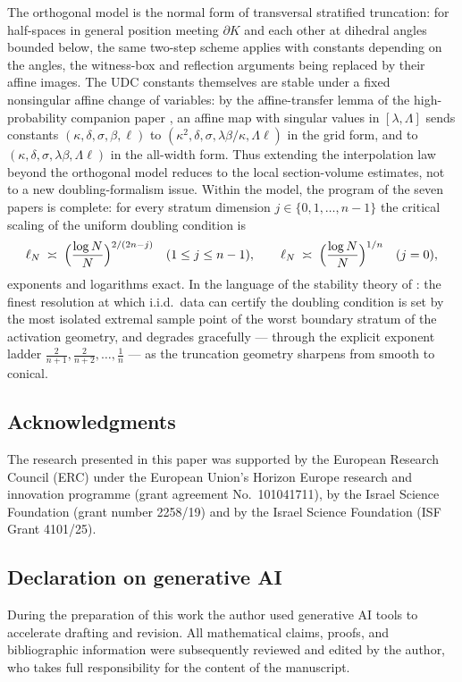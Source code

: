 ﻿\documentclass[11pt]{article}
\begin{document}
The orthogonal model is the normal form of transversal stratified truncation:
for half-spaces in general position meeting $\partial K$ and each other at
dihedral angles bounded below, the same two-step scheme applies with
constants depending on the angles, the witness-box and reflection arguments
being replaced by their affine images.  The UDC constants themselves are stable
under a fixed nonsingular affine change of variables: by the affine-transfer
lemma of the high-probability companion paper \cite{companion2}, an affine map
with singular values in $[\lambda,\Lambda]$ sends constants
$(\kappa,\delta,\sigma,\beta,\ell)$ to
$(\kappa^2,\delta,\sigma,\lambda\beta/\kappa,\Lambda\ell)$ in the grid form,
and to $(\kappa,\delta,\sigma,\lambda\beta,\Lambda\ell)$ in the all-width form.
Thus extending the interpolation law beyond the orthogonal model reduces to the
local section-volume estimates, not to a new doubling-formalism issue.  Within
the model, the program of the seven papers is complete:
for every stratum dimension $j\in\{0,1,\dots,n-1\}$ the critical scaling of
the uniform doubling condition is
\[
\ell_N\;\asymp\;\Bigl(\frac{\log N}{N}\Bigr)^{2/(2n-j)}
\quad(1\le j\le n-1),
\qquad
\ell_N\;\asymp\;\Bigl(\frac{\log N}{N}\Bigr)^{1/n}
\quad(j=0),
\]
exponents and logarithms exact.  In the language of the stability theory of
\cite{BJS,ShmaloUDC}: the finest resolution at which i.i.d.\ data can certify
the doubling condition is set by the most isolated extremal sample point of
the worst boundary stratum of the activation geometry, and degrades
gracefully --- through the explicit exponent ladder
$\frac{2}{n+1},\frac{2}{n+2},\dots,\frac1n$ --- as the truncation geometry
sharpens from smooth to conical.

\subsection*{Acknowledgments}
The research presented in this paper was supported by the European Research
Council (ERC) under the European Union's Horizon Europe research and
innovation programme (grant agreement No.\ 101041711), by the Israel Science
Foundation (grant number 2258/19) and by the Israel Science Foundation (ISF
Grant 4101/25).

\subsection*{Declaration on generative AI}
During the preparation of this work the author used generative AI tools to
accelerate drafting and revision.  All mathematical claims, proofs, and
bibliographic information were subsequently reviewed and edited by the
author, who takes full responsibility for the content of the manuscript.
\end{document}
